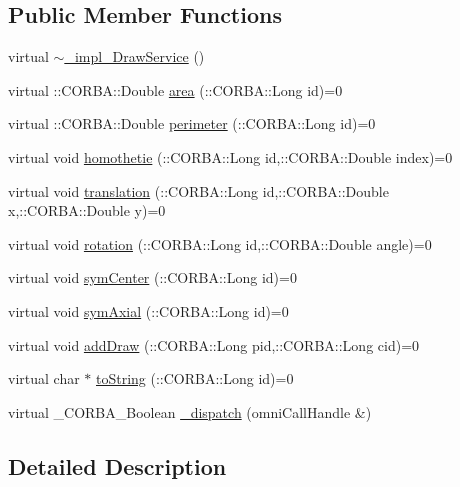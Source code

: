 \subsection*{Public Member Functions}
\begin{DoxyCompactItemize}
\item 
virtual \hyperlink{class__impl___draw_service_abc5f8fe906c4a25bf7c383522c7de6f0}{$\sim$\+\_\+impl\+\_\+\+Draw\+Service} ()
\item 
virtual \+::C\+O\+R\+B\+A\+::\+Double \hyperlink{class__impl___draw_service_a56f247aa66ce6d19f0efb668bef1c98c}{area} (\+::C\+O\+R\+B\+A\+::\+Long id)=0
\item 
virtual \+::C\+O\+R\+B\+A\+::\+Double \hyperlink{class__impl___draw_service_acea99a5740af9baaaca7e31cf811b1f5}{perimeter} (\+::C\+O\+R\+B\+A\+::\+Long id)=0
\item 
virtual void \hyperlink{class__impl___draw_service_aa5dfb4b031e2f90522da143f3effcf05}{homothetie} (\+::C\+O\+R\+B\+A\+::\+Long id,\+::C\+O\+R\+B\+A\+::\+Double index)=0
\item 
virtual void \hyperlink{class__impl___draw_service_a16a7618df309aa42a6c54db76b288cb8}{translation} (\+::C\+O\+R\+B\+A\+::\+Long id,\+::C\+O\+R\+B\+A\+::\+Double x,\+::C\+O\+R\+B\+A\+::\+Double y)=0
\item 
virtual void \hyperlink{class__impl___draw_service_a3a326593c83412786dec749736471ef9}{rotation} (\+::C\+O\+R\+B\+A\+::\+Long id,\+::C\+O\+R\+B\+A\+::\+Double angle)=0
\item 
virtual void \hyperlink{class__impl___draw_service_aea4e775f321ba6cdc625337001e0bb17}{sym\+Center} (\+::C\+O\+R\+B\+A\+::\+Long id)=0
\item 
virtual void \hyperlink{class__impl___draw_service_a72090bd05cc79fc89fac766aa7d21132}{sym\+Axial} (\+::C\+O\+R\+B\+A\+::\+Long id)=0
\item 
virtual void \hyperlink{class__impl___draw_service_a4e609f28be9ac2f4d15fcc3abdc17270}{add\+Draw} (\+::C\+O\+R\+B\+A\+::\+Long pid,\+::C\+O\+R\+B\+A\+::\+Long cid)=0
\item 
virtual char $\ast$ \hyperlink{class__impl___draw_service_a7b115f6ba7092715c74ad6be39a29a03}{to\+String} (\+::C\+O\+R\+B\+A\+::\+Long id)=0
\item 
virtual \+\_\+\+C\+O\+R\+B\+A\+\_\+\+Boolean \hyperlink{class__impl___draw_service_a12bd1d1156617ee727eb120028728d65}{\+\_\+dispatch} (omni\+Call\+Handle \&)
\end{DoxyCompactItemize}


\subsection{Detailed Description}


